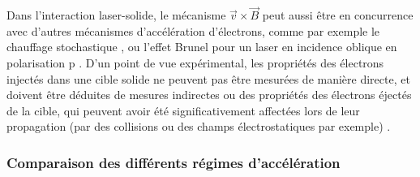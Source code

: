 \begin{refsection}
Dans l'interaction laser-solide, le mécanisme $\vec{v} \times \vec{B}$ peut aussi être en concurrence avec d'autres mécanismes d'accélération d'électrons, comme par exemple le chauffage stochastique \parencite{bourdier_2005, chopineau_2019}, ou l'effet Brunel pour un laser en incidence oblique en polarisation p \parencite{brunel_1987, chopineau_2019}. D'un point de vue expérimental, les propriétés des électrons injectés dans une cible solide ne peuvent pas être mesurées de manière directe, et doivent être déduites de mesures indirectes ou des propriétés des électrons éjectés de la cible, qui peuvent avoir été significativement affectées lors de leur propagation (par des collisions ou des champs électrostatiques par exemple) \parencite{link_2011a}.

\subsubsection{Comparaison des différents régimes d'accélération}


\end{refsection}
